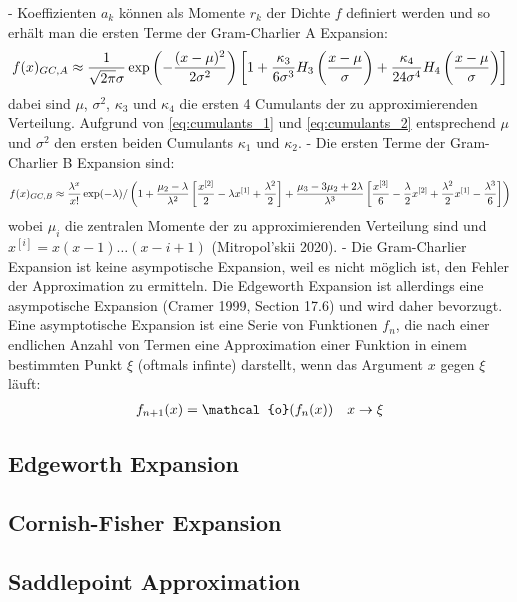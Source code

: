 - Koeffizienten $a_k$ können als Momente $r_k$ der Dichte $f$ definiert werden und so erhält man die ersten Terme der Gram-Charlier A Expansion:
\begin{align}
    f(x)_{GC,A} \approx \frac{1}{\sqrt{2\pi}\sigma}\exp\left(-\frac{(x-\mu)^2}{2\sigma^2}\right) \left[1 + \frac{\kappa_3}{6\sigma^3}H_3\left(\frac{x-\mu}{\sigma}\right) + \frac{\kappa_4}{24\sigma^4}H_4\left(\frac{x-\mu}{\sigma}\right)\right] \notag
\end{align}
dabei sind $\mu$, $\sigma^2$, $\kappa_3$ und $\kappa_4$ die ersten 4 Cumulants der zu approximierenden Verteilung. Aufgrund von \eqref{eq:cumulants_1} und \eqref{eq:cumulants_2} entsprechend $\mu$ und $\sigma^2$ den ersten beiden Cumulants $\kappa_1$ und $\kappa_2$.
- Die ersten Terme der Gram-Charlier B Expansion sind:
\begin{align}
    f(x)_{GC,B} \approx \frac{\lambda^x}{x!}\exp(-\lambda) /\left(1 + \frac{\mu_2 - \lambda}{\lambda^2}\left[\frac{x^{[2]}}{2} - \lambda x^{[1]} + \frac{\lambda^2}{2}\right] + \frac{\mu_3 - 3\mu_2 + 2\lambda}{\lambda^3}\left[\frac{x^{[3]}}{6} - \frac{\lambda}{2}x^{[2]} + \frac{\lambda^2}{2}x^{[1]} - \frac{\lambda^3}{6}\right]\right) \notag
\end{align}
wobei $\mu_i$ die zentralen Momente der zu approximierenden Verteilung sind und $x^{[i]} = x(x-1)\dots (x-i+1)$ (Mitropol'skii 2020).
- Die Gram-Charlier Expansion ist keine asympotische Expansion, weil es nicht möglich ist, den Fehler der Approximation zu ermitteln. Die Edgeworth Expansion ist allerdings eine asympotische Expansion (Cramer 1999, Section 17.6) und wird daher bevorzugt. Eine asymptotische Expansion ist eine Serie von Funktionen $f_n$, die nach einer endlichen Anzahl von Termen eine Approximation einer Funktion in einem bestimmten Punkt $\xi$ (oftmals infinte) darstellt, wenn das Argument $x$ gegen $\xi$ läuft:
\begin{align}
    f_{n+1}(x) = \mathcal{o}(f_n(x)) \quad x\to\xi \notag
\end{align}

\subsection{Edgeworth Expansion}

\subsection{Cornish-Fisher Expansion}

\subsection{Saddlepoint Approximation}